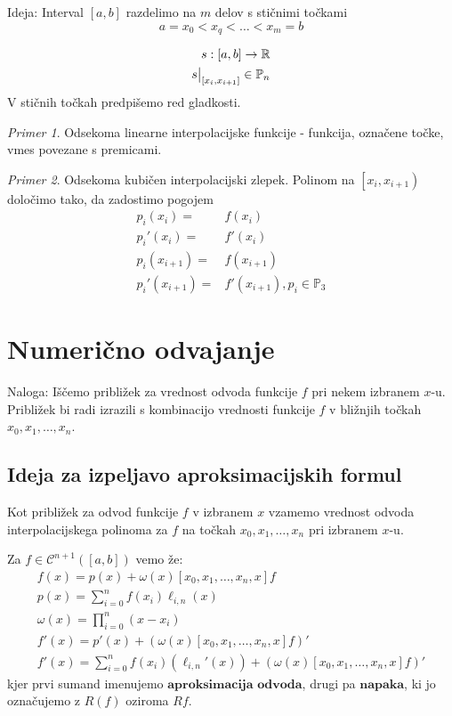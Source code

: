 \documentclass[a4paper,12pt]{article}
\theoremstyle{definition}
\theoremstyle{remark}
\newtheorem*{ex}{Primer}
\newcommand{\R}{\mathbb{R}}
\newcommand{\Pp}{\mathbb{P}}
\newcounter{subsubsubsection}[subsubsection]
\newcommand\restr[2]{{%
  \left.\kern-\nulldelimiterspace %
  #1 %
  \littletaller %
  \right|_{#2} %
  }}
\newcommand{\littletaller}{\mathchoice{\vphantom{\big|}}{}{}{}}
\begin{document}

Ideja: Interval $[a, b]$ razdelimo na $m$ delov s stičnimi točkami 
\begin{equation*}
    a = x_0 < x_q < \dots < x_m = b
\end{equation*}


\begin{align*}
    s: [a, b] \to \R \\
    \restr{s}{[x_i, x_{i+1}]} \in \Pp_n
\end{align*}
V stičnih točkah predpišemo red gladkosti.

\begin{ex}
    Odsekoma linearne interpolacijske funkcije - funkcija, označene točke, vmes povezane s premicami. %
\end{ex}

\begin{ex}
    Odsekoma kubičen interpolacijski zlepek.
    Polinom na $\left[ x_i, x_{i+1}\right)$ določimo tako, da zadostimo pogojem
    \begin{align*}
        p_i(x_i) =& f(x_i) \\
        p_i'(x_i) =& f'(x_i) \\
        p_i(x_{i+1}) =& f(x_{i+1}) \\
        p_i'(x_{i+1}) =& f'(x_{i+1}), p_i \in \Pp_3
    \end{align*}
\end{ex}



\newpage
\section{Numerično odvajanje}

Naloga: Iščemo približek za vrednost odvoda funkcije $f$ pri nekem izbranem $x$-u. Približek bi radi izrazili s kombinacijo vrednosti funkcije $f$
v bližnjih točkah $x_0, x_1, \dots, x_n$.

\subsection{Ideja za izpeljavo aproksimacijskih formul}
Kot približek za odvod funkcije $f$ v izbranem $x$ vzamemo vrednost odvoda interpolacijskega polinoma za $f$ na točkah $x_0, x_1, \dots, x_n$ pri
izbranem $x$-u.

Za $f \in \mathscr{C}^{n+1} ([a, b])$ vemo že:
\begin{gather*}
    f(x) = p(x) + \omega(x)[x_0, x_1, \dots, x_n, x] f \\
    p(x) = \sum_{i = 0}^{n} f(x_i) \ell_{i, n}(x) \\
    \omega(x) = \prod_{i=0}^{n}(x-x_i) \\
    f'(x) = p'(x) + (\omega(x)[x_0, x_1, \dots, x_n, x] f)' \\
    f'(x) = \sum_{i=0}^{n}f(x_i) (\ell_{i,n}'(x)) + (\omega(x)[x_0, x_1, \dots, x_n, x] f)'
\end{gather*}
kjer prvi sumand imenujemo $\textbf{aproksimacija odvoda}$, drugi pa $\textbf{napaka}$, ki jo
označujemo z $R(f)$ oziroma $Rf$.
\end{document}
